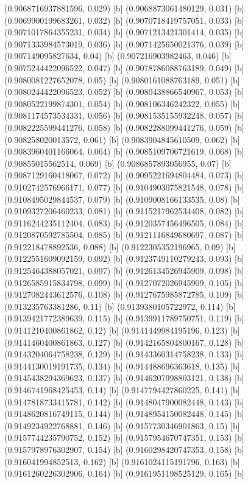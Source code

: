 {{{(0.9068716937881596, 0.029) [b] 
(0.9068873061480129, 0.031) [b] 
(0.9069900199683261, 0.032) [b] 
(0.9070718419757051, 0.033) [b] 
(0.9071017864355231, 0.034) [b] 
(0.9071213421301414, 0.035) [b] 
(0.9071333984573019, 0.036) [b] 
(0.9071425650021376, 0.039) [b] 
(0.907149095827634, 0.04) [b] 
(0.907216903982463, 0.046) [b] 
(0.9075244422096522, 0.047) [b] 
(0.9078786088763189, 0.049) [b] 
(0.9080081227652078, 0.05) [b] 
(0.9080161088763189, 0.051) [b] 
(0.9080244422096523, 0.052) [b] 
(0.9080438866540967, 0.053) [b] 
(0.9080522199874301, 0.054) [b] 
(0.908106346242322, 0.055) [b] 
(0.9081174573534331, 0.056) [b] 
(0.9081535155932248, 0.057) [b] 
(0.9082225599441276, 0.058) [b] 
(0.9082288099441276, 0.059) [b] 
(0.908258020013572, 0.061) [b] 
(0.9083904845610509, 0.062) [b] 
(0.9083960401166064, 0.064) [b] 
(0.9085109706721619, 0.068) [b] 
(0.90855015562514, 0.069) [b] 
(0.9086857893056955, 0.07) [b] 
(0.9087129160418067, 0.072) [b] 
(0.9095221694804484, 0.073) [b] 
(0.9102742576966171, 0.077) [b] 
(0.9104903075821548, 0.078) [b] 
(0.9108495029844537, 0.079) [b] 
(0.9109008166133535, 0.08) [b] 
(0.9109327206460233, 0.081) [b] 
(0.9115217962534408, 0.082) [b] 
(0.9116244235112404, 0.083) [b] 
(0.9120357456496505, 0.084) [b] 
(0.9120870592785504, 0.085) [b] 
(0.9121116849680697, 0.087) [b] 
(0.912218478892536, 0.088) [b] 
(0.9122305352196965, 0.09) [b] 
(0.9122551609092159, 0.092) [b] 
(0.9123749110279243, 0.093) [b] 
(0.9125464388057021, 0.097) [b] 
(0.9126134526945909, 0.098) [b] 
(0.9126585915834798, 0.099) [b] 
(0.9127072026945909, 0.105) [b] 
(0.9127082443612576, 0.108) [b] 
(0.9127675985872785, 0.109) [b] 
(0.913235763381286, 0.11) [b] 
(0.9139380105722972, 0.114) [b] 
(0.9139421772389639, 0.115) [b] 
(0.9139911789750751, 0.119) [b] 
(0.9141210400861862, 0.12) [b] 
(0.9141449984195196, 0.123) [b] 
(0.9141460400861863, 0.127) [b] 
(0.9142165804800167, 0.128) [b] 
(0.9143204064758238, 0.129) [b] 
(0.9143360314758238, 0.133) [b] 
(0.9144130019191735, 0.134) [b] 
(0.914488696363618, 0.135) [b] 
(0.9145438294369623, 0.137) [b] 
(0.9146207998803121, 0.138) [b] 
(0.9146741968425453, 0.14) [b] 
(0.9147794427860225, 0.141) [b] 
(0.9147818733415781, 0.142) [b] 
(0.9148047900082448, 0.143) [b] 
(0.9148620816749115, 0.144) [b] 
(0.9148954150082448, 0.145) [b] 
(0.9149234922768881, 0.146) [b] 
(0.9157730346901863, 0.15) [b] 
(0.9157744235790752, 0.152) [b] 
(0.9157954670747351, 0.153) [b] 
(0.9157978976302907, 0.154) [b] 
(0.9160298420747353, 0.158) [b] 
(0.916041994852513, 0.162) [b] 
(0.9161024115191796, 0.163) [b] 
(0.9161260226302906, 0.164) [b] 
(0.9161951198525129, 0.165) [b] 
}}}
